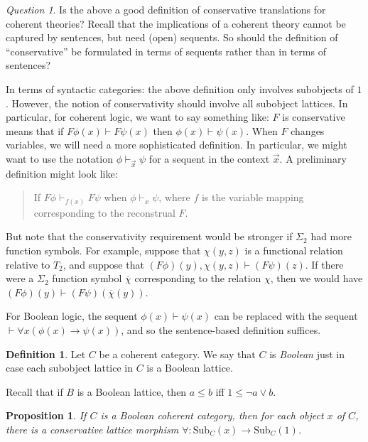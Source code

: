 \documentclass[12pt]{article}
\newtheorem{prop}{Proposition}
\theoremstyle{definition}
\newtheorem*{defn}{Definition}
\theoremstyle{remark}
\newtheorem*{question}{Question}
\newcommand{\3}{\mathcal}
\begin{document}
\begin{question} Is the above a good definition of conservative
  translations for coherent theories?  Recall that the implications of
  a coherent theory cannot be captured by sentences, but need (open)
  sequents. So should the definition of ``conservative'' be formulated
  in terms of sequents rather than in terms of sentences?

  In terms of syntactic categories: the above definition only involves
  subobjects of $1$. However, the notion of conservativity should
  involve all subobject lattices.  In particular, for coherent logic,
  we want to say something like: $F$ is conservative means that if
  $F\phi (x)\vdash F\psi (x)$ then $\phi (x)\vdash\psi (x)$. When $F$
  changes variables, we will need a more sophisticated definition. In
  particular, we might want to use the notation
  $\phi\vdash _{\vec{x}}\psi$ for a sequent in the context
  $\vec{x}$. A preliminary definition might look like:
  \begin{quote} If $F\phi\vdash _{f(x)}F\psi$ when
    $\phi\vdash _x\psi$, where $f$ is the variable mapping
    corresponding to the reconstrual $F$. \end{quote} But note that
  the conservativity requirement would be stronger if $\Sigma _2$ had
  more function symbols. For example, suppose that $\chi (y,z)$ is a
  functional relation relative to $T_2$, and suppose that
  $(F\phi )(y),\chi (y,z)\vdash (F\psi )(z)$. If there were a
  $\Sigma _2$ function symbol $\overline{\chi}$ corresponding to the
  relation $\chi$, then we would have
  $(F\phi )(y)\vdash (F\psi )(\overline{\chi}(y))$.
  
  For Boolean logic, the sequent $\phi (x)\vdash \psi (x)$ can be
  replaced with the sequent $\vdash \forall x(\phi (x)\to \psi (x))$,
  and so the sentence-based definition suffices. \end{question}

\begin{defn} Let $C$ be a coherent category. We say that $C$ is
  \emph{Boolean} just in case each subobject lattice in $C$ is a
  Boolean lattice. \end{defn}

Recall that if $B$ is a Boolean lattice, then $a\leq b$ iff
$1\leq \neg a\vee b$.


\begin{prop} If $C$ is a Boolean coherent category, then for each
  object $x$ of $C$, there is a conservative lattice morphism
  $\forall :\mathrm{Sub}_C(x)\to \mathrm{Sub}_C(1)$. \end{prop}
\end{document}
